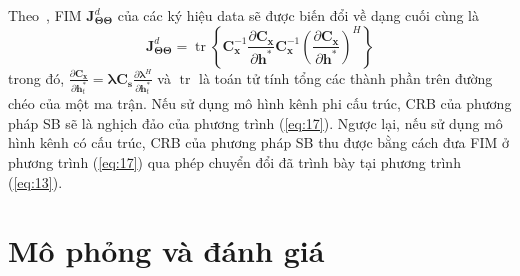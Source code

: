 Theo~\cite{Kay1993}, FIM $\mathbf{J}_{\boldsymbol{\Theta} \boldsymbol{\Theta}}^{d}$ của các ký hiệu data sẽ được biến đổi về dạng cuối cùng là
\begin{equation}
    \mathbf{J}_{\boldsymbol{\Theta} \boldsymbol{\Theta}}^{d}=\operatorname{tr}\left\{\mathbf{C}_{\mathbf{x}}^{-1} \frac{\partial \mathbf{C}_{\mathbf{x}}}{\partial \mathbf{h}^{*}} \mathbf{C}_{\mathbf{x}}^{-1}\left(\frac{\partial \mathbf{C}_{\mathbf{x}}}{\partial \mathbf{h}^{*}}\right)^{H}\right\}
\end{equation}
trong đó, $\frac{\partial \mathbf{C}_{\mathbf{x}}}{\partial \mathbf{h}_{t}^{*}}=\boldsymbol{\lambda} \mathbf{C}_{\mathbf{s}} \frac{\partial \boldsymbol{\lambda}^{H}}{\partial \mathbf{h}_{t}^{*}}$ và $\operatorname{tr}$ là toán tử tính tổng các thành phần trên đường chéo của một ma trận. Nếu sử dụng mô hình kênh phi cấu trúc, CRB của phương pháp SB sẽ là nghịch đảo của phương trình (\ref{eq:17}). Ngược lại, nếu sử dụng mô hình kênh có cấu trúc, CRB của phương pháp SB thu được bằng cách đưa FIM ở phương trình (\ref{eq:17}) qua phép chuyển đổi đã trình bày tại phương trình (\ref{eq:13}).

\section{Mô phỏng và đánh giá}\label{SR}

